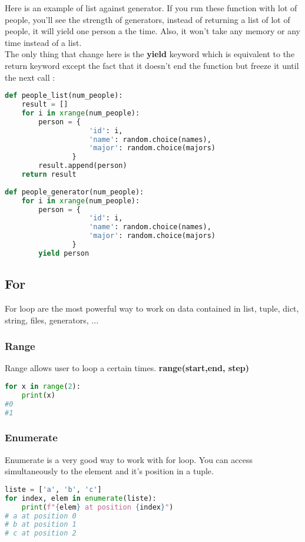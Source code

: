 \documentclass[a4paper, 12pt, titlepage]{scrartcl} %
\begin{document}
Here is an example of list against generator. If you run these function with lot of people, you'll see the strength of generators, instead of returning a list of lot of people, it will yield one person a the time. Also, it won't take any memory or any time instead of a list. \\
The only thing that change here is the \textbf{yield} keyword which is equivalent to the return keyword except the fact that it doesn't end the function but freeze it until the next call :
\begin{lstlisting}[language=Python]
def people_list(num_people):
    result = []
    for i in xrange(num_people):
        person = {
                    'id': i,
                    'name': random.choice(names),
                    'major': random.choice(majors)
                }
        result.append(person)
    return result
    
def people_generator(num_people):
    for i in xrange(num_people):
        person = {
                    'id': i,
                    'name': random.choice(names),
                    'major': random.choice(majors)
                }
        yield person
\end{lstlisting} \vspace{5mm}


\subsection{For}
\label{subsec:For}
For loop are the most powerful way to work on data contained in list, tuple, dict, string, files, generators, ... 

\subsubsection{Range}
Range allows user to loop a certain times. \textbf{range(start,end, step)}
\begin{lstlisting}[language=Python]
for x in range(2):
	print(x)
#0
#1
\end{lstlisting} \vspace{5mm}

\subsubsection{Enumerate}
Enumerate is a very good way to work with for loop. You can access simultaneously to the element and it's position in a tuple.
\begin{lstlisting}[language=Python]
liste = ['a', 'b', 'c']
for index, elem in enumerate(liste):
	print(f"{elem} at position {index}")
# a at position 0
# b at position 1
# c at position 2
\end{lstlisting} \vspace{5mm}
\end{document}
